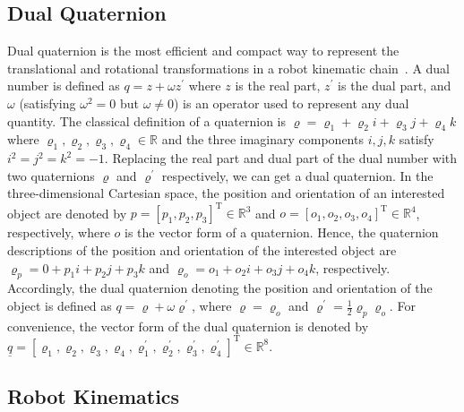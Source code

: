 \documentclass[journal,twoside,web]{ieeecolor}
\begin{document}
\subsection{Dual Quaternion}

Dual quaternion is the most efficient and compact way to represent the translational and rotational transformations in a robot kinematic chain~\cite{Pham2010}. A dual number is defined as $q=z + \omega z^\prime$ where $z$ is the real part, $z^\prime$ is the dual part, and $\omega$ (satisfying $\omega^2=0$ but $\omega\ne 0$) is an operator used to represent any dual quantity. The classical definition of a quaternion is $\varrho = \varrho_1 + \varrho_2 i + \varrho_3 j + \varrho_4 k$ where $\varrho_1,\varrho_2,\varrho_3,\varrho_4 \in \mathbb R$ and the three imaginary components $i,j,k$ satisfy $i^2=j^2=k^2=-1$. Replacing the real part and dual part of the dual number with two quaternions $\varrho$ and $\varrho^\prime$ respectively, we can get a dual quaternion. In the three-dimensional Cartesian space, the position and orientation of an interested object are denoted by $p=[p_1, p_2, p_3]^\mathrm T \in \mathbb{R}^3$ and $o=[o_1, o_2, o_3, o_4]^\mathrm T \in \mathbb{R}^4$, respectively, where $o$ is the vector form of a quaternion. Hence, the quaternion descriptions of the position and orientation of the interested object are $\varrho_p = 0 + p_1 i + p_2 j + p_3 k$ and $\varrho_o = o_1 + o_2 i + o_3 j + o_4 k$, respectively. Accordingly, the dual quaternion denoting the position and orientation of the object is defined as $q=\varrho + \omega \varrho^\prime$, where $\varrho = \varrho_o$ and $\varrho^\prime=\frac{1}{2}\varrho_p \varrho_o$. For convenience, the vector form of the dual quaternion is denoted by $\underline{q}=[\varrho_1,\varrho_2,\varrho_3,\varrho_4, \varrho^\prime_1,\varrho^\prime_2,\varrho^\prime_3,\varrho^\prime_4]^\mathrm T \in \mathbb{R}^8$.


\subsection{Robot Kinematics}
\end{document}
